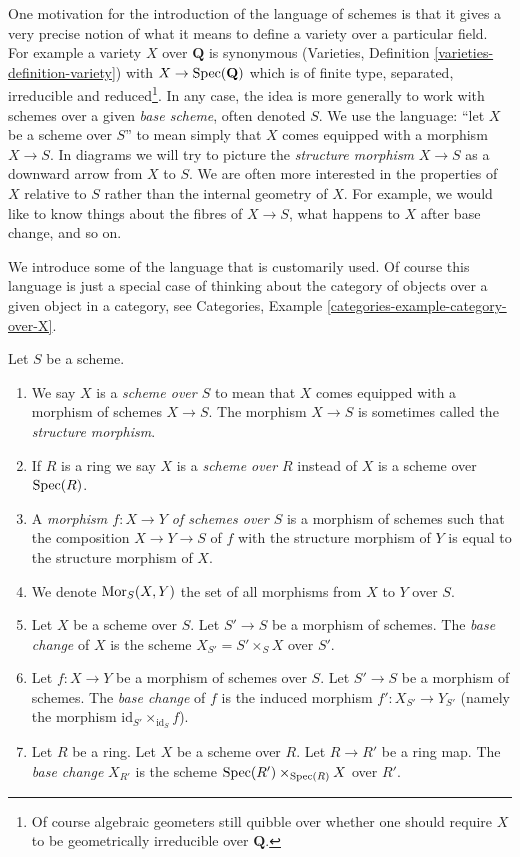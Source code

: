 \noindent
One motivation for the introduction of the language of schemes
is that it gives a very precise notion of what it means to
define a variety over a particular field. For example a variety
$X$ over $\mathbf{Q}$ is synonymous
(Varieties, Definition \ref{varieties-definition-variety})
with $X \to \mathop{\mathrm{Spec}}(\mathbf{Q})$ which is of finite type,
separated, irreducible and reduced\footnote{Of course algebraic
geometers still quibble over whether one should require $X$ to be
geometrically irreducible over $\mathbf{Q}$.}. In any case, the idea
is more generally to work with schemes over a given {\it base scheme},
often denoted $S$. We use the language: ``let $X$ be a scheme over $S$''
to mean simply that $X$ comes equipped with a morphism $X \to S$.
In diagrams we will try to picture the {\it structure morphism}
$X \to S$ as a downward arrow from $X$ to $S$.
We are often more interested in the properties of $X$ relative
to $S$ rather than the internal geometry of $X$.
For example, we would like to know things about the fibres of $X \to S$,
what happens to $X$ after base change, and so on.

\medskip\noindent
We introduce some of the language that is customarily used.
Of course this language is just a special case of thinking
about the category of objects over a given object in a category,
see Categories, Example \ref{categories-example-category-over-X}.

\begin{definition}
\label{definition-base-change}
Let $S$ be a scheme.
\begin{enumerate}
\item We say $X$ is a {\it scheme over $S$} to mean that $X$
comes equipped with a morphism of schemes $X \to S$.
The morphism $X \to S$ is sometimes called the
{\it structure morphism}.
\item If $R$ is a ring we say
$X$ is a {\it scheme over $R$} instead of
$X$ is a scheme over $\mathop{\mathrm{Spec}}(R)$.
\item A {\it morphism $f : X \to Y$ of schemes over $S$}
is a morphism of schemes such that the composition
$X \to Y \to S$ of $f$ with the structure morphism of $Y$ is
equal to the structure morphism of $X$.
\item We denote $\mathop{\mathrm{Mor}}\nolimits_S(X, Y)$ the set of all morphisms
from $X$ to $Y$ over $S$.
\item Let $X$ be a scheme over $S$. Let $S' \to S$ be a
morphism of schemes. The {\it base change} of $X$
is the scheme $X_{S'} = S' \times_S X$ over $S'$.
\item Let $f : X \to Y$ be a morphism of schemes over $S$. Let $S' \to S$
be a morphism of schemes. The {\it base change} of $f$ is
the induced morphism $f' : X_{S'} \to Y_{S'}$ (namely the
morphism $\text{id}_{S'} \times_{\text{id}_S} f$).
\item Let $R$ be a ring. Let $X$ be a scheme over $R$.
Let $R \to R'$ be a ring map. The {\it base change} $X_{R'}$
is the scheme $\mathop{\mathrm{Spec}}(R') \times_{\mathop{\mathrm{Spec}}(R)} X$
over $R'$.
\end{enumerate}
\end{definition}

